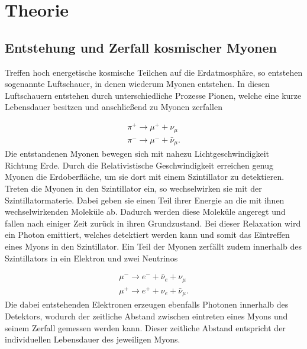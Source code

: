 \section{Theorie}
\label{sec:Theorie}



\subsection{Entstehung und Zerfall kosmischer Myonen}
Treffen hoch energetische kosmische Teilchen auf die Erdatmosphäre, so entstehen sogenannte Luftschauer, in denen wiederum Myonen entstehen.
In diesen Luftschauern entstehen durch unterschiedliche Prozesse Pionen, welche eine kurze Lebensdauer besitzen und anschließend zu Myonen zerfallen

\begin{align*}
    \pi^+ \rightarrow \mu^+ + \nu_\mu \\
    \pi^- \rightarrow \mu^- + \bar \nu_\mu.
\end{align*}
Die entstandenen Myonen bewegen sich mit nahezu Lichtgeschwindigkeit Richtung Erde. 
Durch die Relativistische Geschwindigkeit erreichen genug Myonen die Erdoberfläche, um sie dort mit einem Szintillator zu detektieren.
Treten die Myonen in den Szintillator ein, so wechselwirken sie mit der Szintillatormaterie.
Dabei geben sie einen Teil ihrer Energie an die mit ihnen wechselwirkenden Moleküle ab.
Dadurch werden diese Moleküle angeregt und fallen nach einiger Zeit zurück in ihren Grundzustand.
Bei dieser Relaxation wird ein Photon emittiert, welches detektiert werden kann und somit das Eintreffen eines Myons in den Szintillator.
Ein Teil der Myonen zerfällt zudem innerhalb des Szintillators in ein Elektron und zwei Neutrinos

\begin{align*}
    \mu^- \rightarrow e^- + \bar \nu_e + \nu_\mu \\
    \mu^+ \rightarrow e^+ + \nu_e + \bar \nu_\mu.
\end{align*}
Die dabei entstehenden Elektronen erzeugen ebenfalls Photonen innerhalb des Detektors, wodurch der zeitliche Abstand zwischen eintreten eines Myons und seinem Zerfall gemessen werden kann.
Dieser zeitliche Abstand entspricht der individuellen Lebensdauer des jeweiligen Myons.


